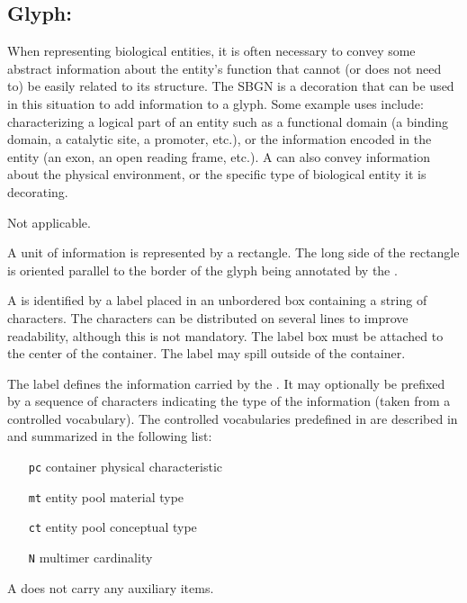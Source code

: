 
\subsection{Glyph: }
\label{sec:unitInfo}

When representing biological entities, it is often necessary to convey some abstract information about the entity's function that cannot (or does not need to) be easily related to its structure.  The SBGN  is a decoration that can be used in this situation to add information to a glyph.  Some example uses include: characterizing a logical part of an entity such as a functional domain (a binding domain, a catalytic site, a promoter, etc.), or the information encoded in the entity (an exon, an open reading frame, etc.).  A  can also convey information about the physical environment, or the specific type of biological entity it is decorating.

\begin{description}

\glyphSboTerm Not applicable.

\glyphContainer A unit of information is represented by a rectangle.  The long side of the rectangle is oriented parallel to the border of the glyph being annotated by the .

\glyphLabel A  is identified by a label placed in an unbordered box containing a string of characters.  The characters can be distributed on several lines to improve readability, although this is not mandatory.  The label box must be attached to the center of the container.  The label may spill outside of the container.

The label defines the information carried by the .  It may optionally be prefixed by a sequence of characters indicating the type of the information (\eg taken from a controlled vocabulary).  The controlled vocabularies predefined in \SBGNPDLone are described in  and summarized in the following list:

\begin{center}
  \begin{itemize}\setlength{\parskip}{0ex}
  \item[\texttt{pc}] container physical characteristic
  \item[\texttt{mt}] entity pool material type
  \item[\texttt{ct}] entity pool conceptual type
  \item[\texttt{N}]  multimer cardinality
  \end{itemize}
\end{center}

\glyphAux A  does not carry any auxiliary items.  

\end{description}

